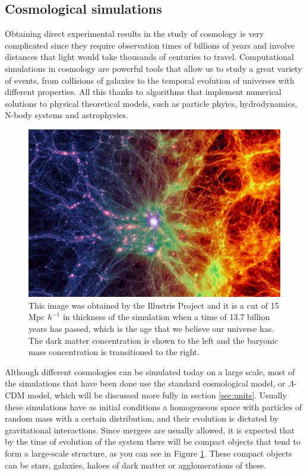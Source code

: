 \subsection{Cosmological simulations}
Obtaining direct experimental results in the study of cosmology is very complicated since they require observation times of billions of years and involve distances that light would take thousands of centuries to travel. Computational simulations in cosmology are powerful tools that allow us to study a great variety of events, from collisions of galaxies to the temporal evolution of  universes with different properties. All this thanks to algorithms that implement numerical solutions to physical theoretical models, such as particle phyics, hydrodynamics, N-body systems and astrophysics.
\begin{figure}[!h]
    \centering
    \includegraphics[width=450pt]{illustris.jpeg}
    \caption{This image was obtained by the Illustris Project \cite{IllustrisHome} and it is a cut of 15 Mpc $h^{-1}$ in thickness of the simulation when a time of 13.7 billion years has passed, which is the age that we believe our universe has. The dark matter concentration is shown to the left and the baryonic mass concentration is transitioned to the right.}
    \label{fig:illustris}
\end{figure}

Although different cosmologies can be simulated today on a large scale, most of the simulations that have been done use the standard cosmological model, or $\Lambda$-CDM model, which will be discussed more fully in section \ref{sec:units}.
Usually these simulations have as initial conditions a homogeneous space with particles of random mass with a certain distribution, and their evolution is dictated by gravitational interactions. Since mergers are usually allowed, it is expected that by the time of evolution of the system there will be compact objects that tend to form a large-scale structure, as you can see in Figure \ref{fig:illustris}. These compact objects can be stars, galaxies, haloes of dark matter or agglomerations of these.




